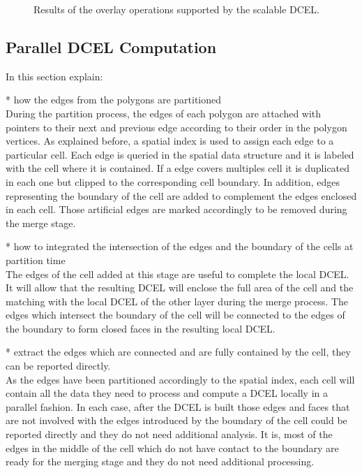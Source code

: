 \begin{figure}[!ht]
    \centering
    
    \caption{Results of the overlay operations supported by the scalable DCEL.}\label{fig:overlay_operations}
\end{figure}

\subsection{Parallel DCEL Computation}
In this section explain:

* how the edges from the polygons are partitioned \\

During the partition process, the edges of each polygon are attached with pointers to their next and previous edge according to their order in the polygon vertices.  As explained before, a spatial index is used to assign each edge to a particular cell.  Each edge is queried in the spatial data structure and it is labeled with the cell where it is contained.  If a edge covers multiples cell it is duplicated in each one but clipped to the corresponding cell boundary.  In addition, edges representing the boundary of the cell are added to complement the edges enclosed in each cell.  Those artificial edges are marked accordingly to be removed during the merge stage.

* how to integrated the intersection of the edges and the boundary of the cells at partition time \\

The edges of the cell added at this stage are useful to complete the local DCEL.  It will allow that the resulting DCEL will enclose the full area of the cell and the matching with the local DCEL of the other layer during the merge process.  The edges which intersect the boundary of the cell will be connected to the edges of the boundary to form closed faces in the resulting local DCEL.

* extract the edges which are connected and are fully contained by the cell, they can be reported directly.\\

As the edges have been partitioned accordingly to the spatial index, each cell will contain all the data they need to process and compute a DCEL locally in a parallel fashion. In each case, after the DCEL is built those edges and faces that are not involved with the edges introduced by the boundary of the cell could be reported directly and they do not need additional analysis.  It is, most of the edges in the middle of the cell which do not have contact to the boundary are ready for the merging stage and they do not need additional processing.




